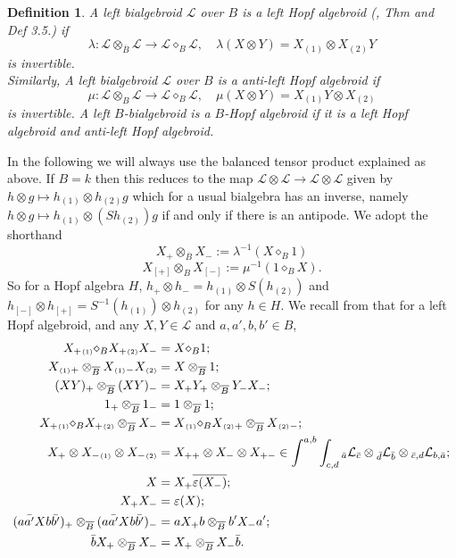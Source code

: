 \documentclass[a4paper,reqno]{amsart}
\numberwithin{equation}{section}
\theoremstyle{plain}
\newtheorem{defi}[thm]{Definition}
\theoremstyle{remark}
\numberwithin{equation}{section}
\newcommand{\ot}{\otimes}
\newcommand{\cL}{\mathcal{L}}
\newcommand{\BB}{\overline{B}}
\newcommand{\one}[1]{{#1}{}_{\scriptscriptstyle{(1)}}}
\newcommand{\two}[1]{{#1}{}_{\scriptscriptstyle{(2)}}}
\renewcommand{\o}{{}_{\scriptscriptstyle{(1)}}}
\renewcommand{\t}{{}_{\scriptscriptstyle{(2)}}}
\newcommand{\di}{{\diamond_{B}}}
\DeclareMathOperator{\tens}{\otimes}
\begin{document}
\begin{defi}\label{defHopf}
A left bialgebroid $\cL$ over $B$ is a left Hopf algebroid (\cite{schau1}, Thm and Def 3.5.) if
\[\lambda: \cL\ot_{\BB}\cL\to \cL\di\cL,\quad
    \lambda(X\ot Y)=\one{X}\ot \two{X}Y\]
is invertible.\\
Similarly, A left bialgebroid $\cL$ over $B$ is a anti-left Hopf algebroid if
\[\mu: \cL\ot_{B}\cL\to \cL\di \cL,\quad
    \mu(X\ot Y)=\one{X}Y\ot \two{X}\]
is invertible. A left $B$-bialgebroid is a $B$-Hopf algebroid if it is a left Hopf algebroid and anti-left Hopf algebroid.
\end{defi}
In the following we will always use the balanced tensor product explained as above. If $B=k$ then this reduces to the map $\cL\tens\cL\to \cL\tens\cL$ given by $h\tens g\mapsto h\o\tens h\t g$ which for a usual bialgebra has an inverse, namely $h\tens g\mapsto h\o\tens (Sh\t)g$ if and only if there is an antipode. We adopt the shorthand
\begin{equation}\label{X+-} X_{+}\ot_{\BB}X_{-}:=\lambda^{-1}(X\di 1)\end{equation}
\begin{equation}\label{X[+][-]} X_{[+]}\ot_{B}X_{[-]}:=\mu^{-1}(1\di X).\end{equation}
So for a Hopf algebra $H$, $h_{+}\ot h_{-}=h\o\ot S(h\t)$ and $h_{[-]}\ot h_{[+]}= S^{-1}(h\o)\ot h\t$ for any $h\in H$.
We recall from \cite[Prop.~3.7]{schau1} that for a left Hopf algebroid, and any $X, Y\in \cL$ and $a,a',b,b'\in B$,
\begin{align}
    \one{X_{+}}\di{}\two{X_{+}}X_{-}&=X\di{}1\label{equ. inverse lamda 1};\\
    \one{X}{}_{+}\ot_{\BB}\one{X}{}_{-}\two{X}&=X\ot_{\BB}1\label{equ. inverse lamda 2};\\
    (XY)_{+}\ot_{\BB}(XY)_{-}&=X_{+}Y_{+}\ot_{\BB}Y_{-}X_{-}\label{equ. inverse lamda 3};\\
    1_{+}\ot_{\BB}1_{-}&=1\ot_{\BB}1\label{equ. inverse lamda 4};\\
    \one{X_{+}}\di{}\two{X_{+}}\ot_{\BB}X_{-}&=\one{X}\di{}\two{X}{}_{+}\ot_{\BB}\two{X}{}_{-}\label{equ. inverse lamda 5};\\
    X_{+}\ot\one{X_{-}}\ot{}\two{X_{-}}&=X_{++}\ot X_{-}\ot{}X_{+-}\in\int^{a,b}\int_{c,d}{}_{\Bar{a}}\cL_{\Bar{c}}\ot {}_{\Bar{d}}\cL_{\Bar{b}}\ot {}_{\Bar{c},d}\cL_{b,\Bar{a}}
    \label{equ. inverse lamda 6};\\
    X&=X_{+}\overline{\varepsilon(X_{-})}\label{equ. inverse lamda 7};\\
    X_{+}X_{-}&=\varepsilon(X)\label{equ. inverse lamda 8};\\
    (a\Bar{a'}Xb\Bar{b'})_{+}\ot_{\BB}(a\Bar{a'}Xb\Bar{b'})_{-}&=aX_{+}b\ot_{\BB}b'X_{-}a'\label{equ. inverse lamda 9};\\
    \Bar{b}X_{+}\ot_{\BB}X_{-}&=X_{+}\ot_{\BB}X_{-}\Bar{b}\label{equ. inverse lamda 10}.
\end{align}
\end{document}
